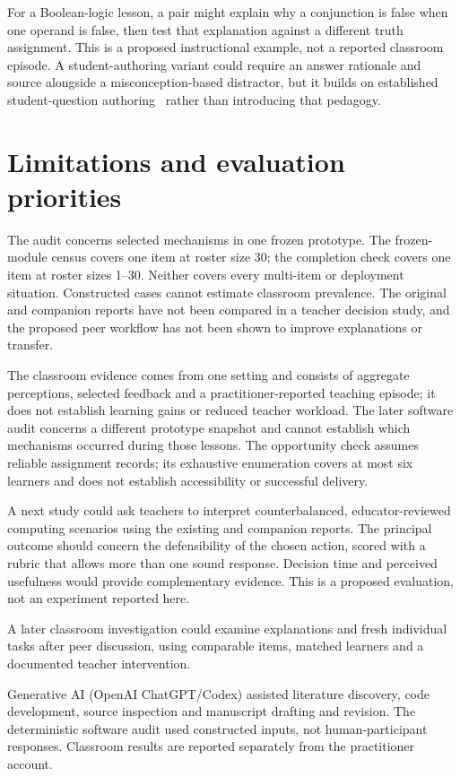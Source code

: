 For a Boolean-logic lesson, a pair might explain why a conjunction is false when one operand is false, then test that explanation against a different truth assignment. This is a proposed instructional example, not a reported classroom episode. A student-authoring variant could require an answer rationale and source alongside a misconception-based distractor, but it builds on established student-question authoring~\cite{peerwise} rather than introducing that pedagogy.

\section{Limitations and evaluation priorities}
The audit concerns selected mechanisms in one frozen prototype. The frozen-module census covers one item at roster size 30; the completion check covers one item at roster sizes 1--30. Neither covers every multi-item or deployment situation. Constructed cases cannot estimate classroom prevalence. The original and companion reports have not been compared in a teacher decision study, and the proposed peer workflow has not been shown to improve explanations or transfer.

The classroom evidence comes from one setting and consists of aggregate perceptions, selected feedback and a practitioner-reported teaching episode; it does not establish learning gains or reduced teacher workload. The later software audit concerns a different prototype snapshot and cannot establish which mechanisms occurred during those lessons. The opportunity check assumes reliable assignment records; its exhaustive enumeration covers at most six learners and does not establish accessibility or successful delivery.

A next study could ask teachers to interpret counterbalanced, educator-reviewed computing scenarios using the existing and companion reports. The principal outcome should concern the defensibility of the chosen action, scored with a rubric that allows more than one sound response. Decision time and perceived usefulness would provide complementary evidence. This is a proposed evaluation, not an experiment reported here.

A later classroom investigation could examine explanations and fresh individual tasks after peer discussion, using comparable items, matched learners and a documented teacher intervention.

Generative AI (OpenAI ChatGPT/Codex) assisted literature discovery, code development, source inspection and manuscript drafting and revision. The deterministic software audit used constructed inputs, not human-participant responses. Classroom results are reported separately from the practitioner account.

